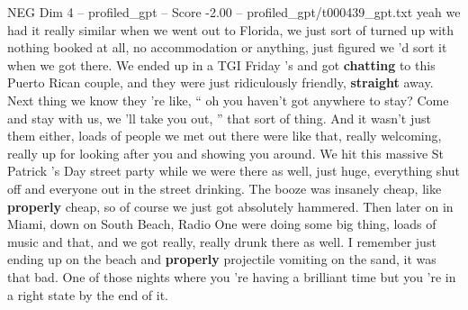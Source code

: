 \begin{textsample}{NEG Dim 4 – profiled\_gpt – Score -2.00 – profiled\_gpt/t000439\_gpt.txt}  \label{ex:f4_neg_020}
yeah we had it really similar when we went out to Florida, we just sort of turned up with nothing booked at all, no accommodation or anything, just figured we ’d sort it when we got there.
We ended up in a TGI Friday ’s and got \textbf{chatting} to this Puerto Rican couple, and they were just ridiculously friendly, \textbf{straight} away.
Next thing we know they ’re like, “ oh you haven't got anywhere to stay?
Come and stay with us, we ’ll take you out, ” that sort of thing.
And it wasn't just them either, loads of people we met out there were like that, really welcoming, really up for looking after you and showing you around.
We hit this massive St Patrick ’s Day street party while we were there as well, just huge, everything shut off and everyone out in the street drinking.
The booze was insanely cheap, like \textbf{properly} cheap, so of course we just got absolutely hammered.
Then later on in Miami, down on South Beach, Radio One were doing some big thing, loads of music and that, and we got really, really drunk there as well.
I remember just ending up on the beach and \textbf{properly} projectile vomiting on the sand, it was that bad.
One of those nights where you ’re having a brilliant time but you ’re in a right state by the end of it.

\end{textsample}
